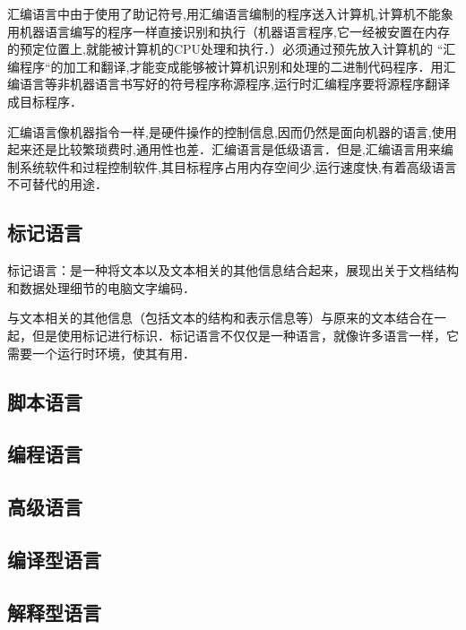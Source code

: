 汇编语言中由于使用了助记符号,用汇编语言编制的程序送入计算机,计算机不能象用机器语言编写的程序一样直接识别和执行（机器语言程序,它一经被安置在内存的预定位置上,就能被计算机的CPU处理和执行．）必须通过预先放入计算机的 “汇编程序“的加工和翻译,才能变成能够被计算机识别和处理的二进制代码程序．用汇编语言等非机器语言书写好的符号程序称源程序,运行时汇编程序要将源程序翻译成目标程序．

汇编语言像机器指令一样,是硬件操作的控制信息,因而仍然是面向机器的语言,使用起来还是比较繁琐费时,通用性也差．汇编语言是低级语言．但是,汇编语言用来编制系统软件和过程控制软件,其目标程序占用内存空间少,运行速度快,有着高级语言不可替代的用途．

\subsection{标记语言}\label{CpLgg_sub3}

标记语言：是一种将文本以及文本相关的其他信息结合起来，展现出关于文档结构和数据处理细节的电脑文字编码．

与文本相关的其他信息（包括文本的结构和表示信息等）与原来的文本结合在一起，但是使用标记进行标识．标记语言不仅仅是一种语言，就像许多语言一样，它需要一个运行时环境，使其有用．

\subsection{脚本语言}\label{CpLgg_sub4}

\subsection{编程语言}\label{CpLgg_sub5}

\subsection{高级语言}\label{CpLgg_sub6}

\subsection{编译型语言}\label{CpLgg_sub7}

\subsection{解释型语言}\label{CpLgg_sub8}
